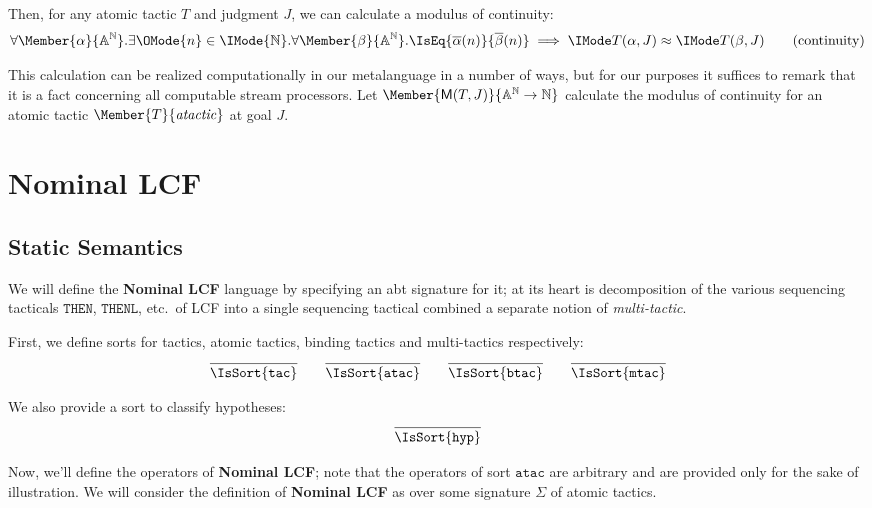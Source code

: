 Then, for any atomic tactic $T$ and judgment $J$, we can calculate a
modulus of continuity:
\begin{equation}
  \forall \Member{\alpha}{\MLStream{\MLAtom}}.
  \exists \OMode{n}\in\IMode{\MLNat}.
  \forall \Member{\beta}{\MLStream{\MLAtom}}.
    \IsEq{\bar{\alpha}(n)}{\bar{\beta}(n)}\implies \KleeneEq{T(\alpha,J)}{T(\beta,J)}
  \tag{continuity}
\end{equation}

This calculation can be realized computationally in our metalanguage in a
number of ways, but for our purposes it suffices to remark that it is a fact
concerning all computable stream processors. Let
$\Member{\ModC{T}{J}}{\MLStream{\MLAtom}\to\MLNat}$ calculate the modulus of continuity
for an atomic tactic $\Member{T}{\LCFAtomicTactic}$ at goal $J$.

\section{Nominal LCF}

\subsection{Static Semantics}

\newcommand\SortATac{\mathtt{atac}}
\newcommand\SortBTac{\mathtt{btac}}
\newcommand\SortTac{\mathtt{tac}}
\newcommand\SortMTac{\mathtt{mtac}}
\newcommand\SortHyp{\mathtt{hyp}}

We will define the \textbf{Nominal LCF} language by specifying an abt signature
for it; at its heart is decomposition of the various sequencing tacticals
$\mathtt{THEN}$, $\mathtt{THENL}$, etc.\ of LCF into a single sequencing
tactical combined a separate notion of \emph{multi-tactic}.

First, we define sorts for tactics, atomic tactics, binding tactics and multi-tactics
respectively:
\begin{gather*}
  \infer{
    \IsSort{\SortTac}
  }{}
  \qquad
  \infer{
    \IsSort{\SortATac}
  }{}
  \qquad
  \infer{
    \IsSort{\SortBTac}
  }{}
  \qquad
  \infer{
    \IsSort{\SortMTac}
  }{}
\end{gather*}

We also provide a sort to classify hypotheses:
\[
  \infer{
    \IsSort{\SortHyp}
  }{
  }
\]

Now, we'll define the operators of \textbf{Nominal LCF}; note that the
operators of sort $\SortATac$ are arbitrary and are provided only for the sake
of illustration. We will consider the definition of \textbf{Nominal LCF} as
over some signature $\Sigma$ of atomic tactics.

